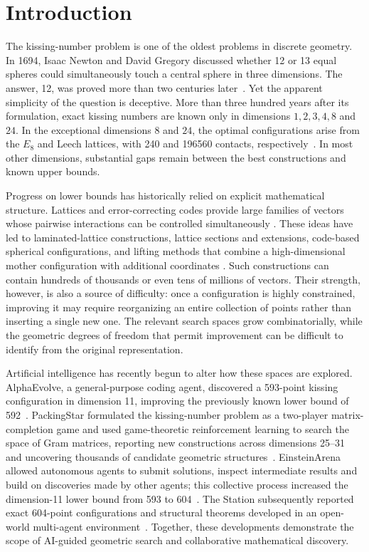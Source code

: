 \section{Introduction}

The kissing-number problem is one of the oldest problems in discrete
geometry. In 1694, Isaac Newton and David Gregory discussed whether
12 or 13 equal spheres could simultaneously touch a central sphere in
three dimensions. The answer, 12, was proved more than two centuries
later~\cite{musin}. Yet the apparent simplicity of the question is
deceptive. More than three hundred years after its formulation, exact
kissing numbers are known only in dimensions $1,2,3,4,8$ and $24$.
In the exceptional dimensions $8$ and $24$, the optimal configurations
arise from the $E_8$ and Leech lattices, with 240 and 196560 contacts,
respectively~\cite{conway1999sphere,musin}. In most other dimensions,
substantial gaps remain between the best constructions and known upper
bounds.

Progress on lower bounds has historically relied on explicit mathematical
structure. Lattices and error-correcting codes provide large families of
vectors whose pairwise interactions can be controlled simultaneously
\cite{conway1999sphere,macwilliams}. These ideas have led to
laminated-lattice constructions, lattice sections and extensions,
code-based spherical configurations, and lifting methods that combine
a high-dimensional mother configuration with additional coordinates
\cite{laminated,antipode,ers,cjkt,kallal}. Such constructions can contain
hundreds of thousands or even tens of millions of vectors. Their strength,
however, is also a source of difficulty: once a configuration is highly
constrained, improving it may require reorganizing an entire collection
of points rather than inserting a single new one. The relevant search
spaces grow combinatorially, while the geometric degrees of freedom that
permit improvement can be difficult to identify from the original
representation.

Artificial intelligence has recently begun to alter how these spaces are
explored. AlphaEvolve, a general-purpose coding agent, discovered a
593-point kissing configuration in dimension 11, improving the previously
known lower bound of 592~\cite{alphaevolve}. PackingStar formulated the kissing-number
problem as a two-player matrix-completion game and used game-theoretic
reinforcement learning to search the space of Gram matrices, reporting
new constructions across dimensions 25--31 and uncovering thousands of
candidate geometric structures~\cite{packingstar-discovery}. EinsteinArena
allowed autonomous agents to submit solutions, inspect intermediate
results and build on discoveries made by other agents; this collective
process increased the dimension-11 lower bound from 593 to
604~\cite{einsteinarena}. The Station subsequently reported exact
604-point configurations and structural theorems developed in an
open-world multi-agent environment~\cite{station}. Together, these
developments demonstrate the scope of AI-guided geometric search and
collaborative mathematical discovery.

